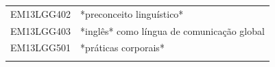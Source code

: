 \documentclass[12pt]{extarticle}
\begin{document}
\begin{longtable}{ll}
EM13LGG402 & *preconceito linguístico*                                                                                                                                                                                                                                                                                                                                                                                                                                                                                                                                                                                                                                                                                                                                                                                             \\
\rowcolor[HTML]{FFF} 
EM13LGG403 & *inglês* como língua de comunicação global                                                                                                                                                                                                                                                                                                                                                                                                                                                                                                                                                                                                                                                                                                                                                                            \\
\rowcolor[HTML]{E0F7FA} 
EM13LGG501 & *práticas corporais*                                                                                                                                                                                                                                                                                                                                                                                                                                                                                                                                                                                                                                                                                                                                                                                                  \\
\rowcolor[HTML]{FFF} 

\end{longtable}
\end{document}
